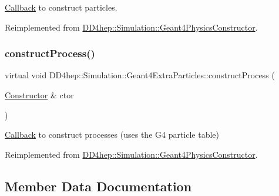 \hyperlink{class_d_d4hep_1_1_callback}{Callback} to construct particles. 



Reimplemented from \hyperlink{class_d_d4hep_1_1_simulation_1_1_geant4_physics_constructor_a2568ea7c84c0514818e665c409efa304}{D\+D4hep\+::\+Simulation\+::\+Geant4\+Physics\+Constructor}.

\hypertarget{class_d_d4hep_1_1_simulation_1_1_geant4_extra_particles_aa87e3c12da9259e49a15a35a5c76698c}{}\label{class_d_d4hep_1_1_simulation_1_1_geant4_extra_particles_aa87e3c12da9259e49a15a35a5c76698c} 
\subsubsection{\texorpdfstring{construct\+Process()}{constructProcess()}}
{\footnotesize\ttfamily virtual void D\+D4hep\+::\+Simulation\+::\+Geant4\+Extra\+Particles\+::construct\+Process (\begin{DoxyParamCaption}\item[{\hyperlink{class_d_d4hep_1_1_simulation_1_1_geant4_physics_constructor_1_1_constructor}{Constructor} \&}]{ctor }\end{DoxyParamCaption})\hspace{0.3cm}{\ttfamily [virtual]}}



\hyperlink{class_d_d4hep_1_1_callback}{Callback} to construct processes (uses the G4 particle table) 



Reimplemented from \hyperlink{class_d_d4hep_1_1_simulation_1_1_geant4_physics_constructor_a11d516af4f7dcfefe4fa7f154cba4386}{D\+D4hep\+::\+Simulation\+::\+Geant4\+Physics\+Constructor}.



\subsection{Member Data Documentation}
\hypertarget{class_d_d4hep_1_1_simulation_1_1_geant4_extra_particles_a83b8c92a3c21c6068ddfe5f93ac650df}{}\label{class_d_d4hep_1_1_simulation_1_1_geant4_extra_particles_a83b8c92a3c21c6068ddfe5f93ac650df} 
